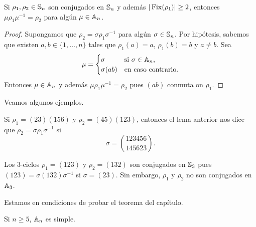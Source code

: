 \begin{lemma}
Si $\rho_1,\rho_2\in\mathbb{S}_n$ son conjugados en $\mathbb{S}_n$ y además $|\operatorname{Fix}(\rho_1)|\geq2$, entonces
$\mu\rho_1\mu^{-1}=\rho_2$ para algún $\mu\in\mathbb{A}_n$.  
\end{lemma}

\begin{proof}
Supongamos que $\rho_2=\sigma\rho_1\sigma^{-1}$ para algún $\sigma\in\mathbb{S}_n$. 
Por hipótesis, sabemos que existen $a,b\in\{1,\dots,n\}$ tales que $\rho_1(a)=a$, $\rho_1(b)=b$ y $a\ne b$. Sea
\[
\mu=\begin{cases}
\sigma & \text{si $\sigma\in\mathbb{A}_n$,}\\
\sigma(ab) & \text{en caso contrario.}
\end{cases}
\]
Entonces $\mu\in\mathbb{A}_n$ y además $\mu\rho_1\mu^{-1}=\rho_2$ pues $(ab)$ conmuta on $\rho_1$. 
\end{proof}

Veamos algunos ejemplos.

\begin{example}
Si $\rho_1=(23)(156)$ y $\rho_2=(45)(123)$, entonces 
el lema anterior nos dice que $\rho_2=\sigma\rho_1\sigma^{-1}$ si 
\[
\sigma=\binom{123456}{145623}.
\]
\end{example}

\begin{example}
Los 3-ciclos $\rho_1=(123)$ y $\rho_2=(132)$ son conjugados en $\mathbb{S}_3$ pues 
$(123)=\sigma(132)\sigma^{-1}$ si $\sigma=(23)$. Sin embargo, $\rho_1$ y $\rho_2$ 
no son conjugados en $\mathbb{A}_3$. 
\end{example}

Estamos en condiciones de probar el teorema del capítulo.

\begin{theorem}[Jordan]
Si $n\geq5$, $\mathbb{A}_n$ es simple. 
\end{theorem}

